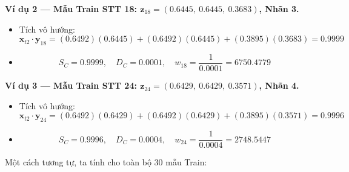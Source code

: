 \documentclass[12pt,a4paper]{article}
\begin{document}
\textbf{Ví dụ 2 — Mẫu Train STT 18: $\mathbf{z}_{18} = (0.6445,\ 0.6445,\ 0.3683)$, Nhãn 3.}
\begin{itemize}
    \item Tích vô hướng:
    \[
        \mathbf{x}_{t2} \cdot \mathbf{y}_{18}
        = (0.6492)(0.6445) + (0.6492)(0.6445) + (0.3895)(0.3683) = 0.9999
    \]
    \item
    \[
        S_C = 0.9999, \quad D_C = 0.0001, \quad
        w_{18} = \frac{1}{0.0001} = 6750.4779
    \]
\end{itemize}
 
\textbf{Ví dụ 3 — Mẫu Train STT 24: $\mathbf{z}_{24} = (0.6429,\ 0.6429,\ 0.3571)$, Nhãn 4.}
\begin{itemize}
    \item Tích vô hướng:
    \[
        \mathbf{x}_{t2} \cdot \mathbf{y}_{24}
        = (0.6492)(0.6429) + (0.6492)(0.6429) + (0.3895)(0.3571) = 0.9996
    \]
    \item
    \[
        S_C = 0.9996, \quad D_C = 0.0004, \quad
        w_{24} = \frac{1}{0.0004} = 2748.5447
    \]
\end{itemize}
 
Một cách tương tự, ta tính cho toàn bộ 30 mẫu Train:
 
\end{document}
